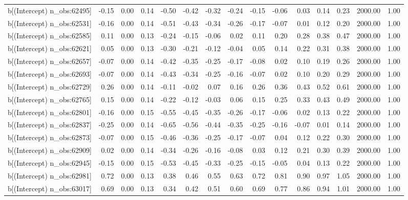 \begin{table}[ht]
\begin{tabular}{rrrrrrrrrrrrrrr}
  b[(Intercept) n\_obs:62495] & -0.15 & 0.00 & 0.14 & -0.50 & -0.42 & -0.32 & -0.24 & -0.15 & -0.06 & 0.03 & 0.14 & 0.23 & 2000.00 & 1.00 \\ 
  b[(Intercept) n\_obs:62531] & -0.16 & 0.00 & 0.14 & -0.51 & -0.43 & -0.34 & -0.26 & -0.17 & -0.07 & 0.01 & 0.12 & 0.20 & 2000.00 & 1.00 \\ 
  b[(Intercept) n\_obs:62585] & 0.11 & 0.00 & 0.13 & -0.24 & -0.15 & -0.06 & 0.02 & 0.11 & 0.20 & 0.28 & 0.38 & 0.47 & 2000.00 & 1.00 \\ 
  b[(Intercept) n\_obs:62621] & 0.05 & 0.00 & 0.13 & -0.30 & -0.21 & -0.12 & -0.04 & 0.05 & 0.14 & 0.22 & 0.31 & 0.38 & 2000.00 & 1.00 \\ 
  b[(Intercept) n\_obs:62657] & -0.07 & 0.00 & 0.14 & -0.42 & -0.35 & -0.25 & -0.17 & -0.08 & 0.02 & 0.10 & 0.19 & 0.26 & 2000.00 & 1.00 \\ 
  b[(Intercept) n\_obs:62693] & -0.07 & 0.00 & 0.14 & -0.43 & -0.34 & -0.25 & -0.16 & -0.07 & 0.02 & 0.10 & 0.20 & 0.29 & 2000.00 & 1.00 \\ 
  b[(Intercept) n\_obs:62729] & 0.26 & 0.00 & 0.14 & -0.11 & -0.02 & 0.07 & 0.16 & 0.26 & 0.36 & 0.43 & 0.52 & 0.61 & 2000.00 & 1.00 \\ 
  b[(Intercept) n\_obs:62765] & 0.15 & 0.00 & 0.14 & -0.22 & -0.12 & -0.03 & 0.06 & 0.15 & 0.25 & 0.33 & 0.43 & 0.49 & 2000.00 & 1.00 \\ 
  b[(Intercept) n\_obs:62801] & -0.16 & 0.00 & 0.15 & -0.55 & -0.45 & -0.35 & -0.26 & -0.17 & -0.06 & 0.02 & 0.13 & 0.22 & 2000.00 & 1.00 \\ 
  b[(Intercept) n\_obs:62837] & -0.25 & 0.00 & 0.14 & -0.65 & -0.56 & -0.44 & -0.35 & -0.25 & -0.16 & -0.07 & 0.01 & 0.14 & 2000.00 & 1.00 \\ 
  b[(Intercept) n\_obs:62873] & -0.07 & 0.00 & 0.15 & -0.46 & -0.36 & -0.25 & -0.17 & -0.07 & 0.04 & 0.12 & 0.22 & 0.30 & 2000.00 & 1.00 \\ 
  b[(Intercept) n\_obs:62909] & 0.02 & 0.00 & 0.14 & -0.34 & -0.26 & -0.16 & -0.08 & 0.03 & 0.12 & 0.21 & 0.30 & 0.39 & 2000.00 & 1.00 \\ 
  b[(Intercept) n\_obs:62945] & -0.15 & 0.00 & 0.15 & -0.53 & -0.45 & -0.33 & -0.25 & -0.15 & -0.05 & 0.04 & 0.13 & 0.22 & 2000.00 & 1.00 \\ 
  b[(Intercept) n\_obs:62981] & 0.72 & 0.00 & 0.13 & 0.38 & 0.46 & 0.55 & 0.63 & 0.72 & 0.81 & 0.90 & 0.97 & 1.05 & 2000.00 & 1.00 \\ 
  b[(Intercept) n\_obs:63017] & 0.69 & 0.00 & 0.13 & 0.34 & 0.42 & 0.51 & 0.60 & 0.69 & 0.77 & 0.86 & 0.94 & 1.01 & 2000.00 & 1.00 \\ 

\end{tabular}
\end{table}
